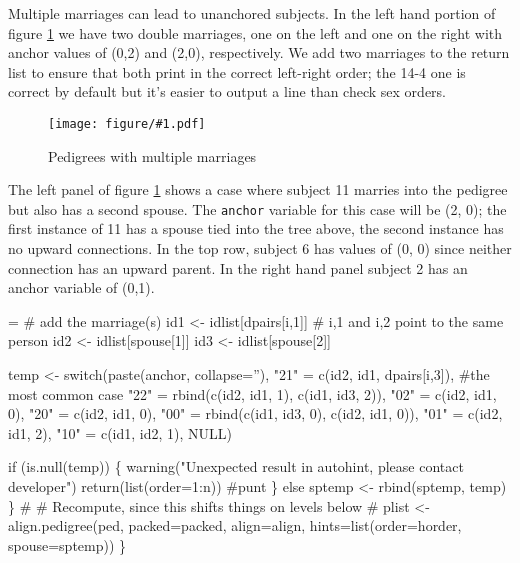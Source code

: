 \documentclass{article}
\newcommand{\myfig}[1]{\resizebox{\textwidth}{!}
                        {\texttt{[image: figure/\#1.pdf]}}}
\begin{document}
Multiple marriages can lead to unanchored subjects.  
In the left hand portion of figure \ref{fig:auto3} we have two
double marriages, one on the left and one on the right with 
anchor values of (0,2) and (2,0), respectively.  
We add two marriages to the return list to ensure that both print
in the correct left-right order; the 14-4 one is correct by default
but it's easier to output a line than check sex orders.  %

\begin{figure}
  \myfig{autohint3}
  \caption{Pedigrees with multiple marriages}
  \label{fig:auto3}
  \end{figure}

The left panel of figure \ref{fig:auto3} shows a case where
subject 11 marries into the pedigree but also has a second spouse.
The \Verb!anchor! variable for
this case will be (2, 0); the first instance of 11 has a spouse tied
into the tree above, the second instance has no upward connections.
In the top row, subject 6 has values of (0, 0) since neither 
connection has an upward parent.  
In the right hand panel subject 2 has an anchor variable of (0,1).

\begin{nwchunk}
=
         # add the marriage(s)
         id1 <- idlist[dpairs[i,1]]  # i,1 and i,2 point to the same person
         id2 <- idlist[spouse[1]]
         id3 <- idlist[spouse[2]]
 
         temp <- switch(paste(anchor, collapse=''),
                        "21" = c(id2, id1, dpairs[i,3]),   #the most common case
                        "22" = rbind(c(id2, id1, 1), c(id1, id3, 2)),
                        "02" = c(id2, id1, 0), 
                        "20" = c(id2, id1, 0), 
                        "00" = rbind(c(id1, id3, 0), c(id2, id1, 0)),
                        "01" = c(id2, id1, 2),
                        "10" = c(id1, id2, 1),
                        NULL)
 
         if (is.null(temp)) \{ 
             warning("Unexpected result in autohint, please contact developer")
             return(list(order=1:n))  #punt
           \}         
         else sptemp <- rbind(sptemp, temp)
         \}
     #
     # Recompute, since this shifts things on levels below
     #
     plist <- align.pedigree(ped, packed=packed, align=align, 
                             hints=list(order=horder, spouse=sptemp))   
     \}
\end{nwchunk}
\end{document}
